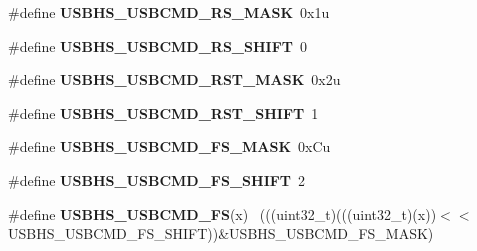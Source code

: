 \begin{DoxyCompactItemize}
\item 
\hypertarget{group___u_s_b_h_s___register___masks_ga3bc037751946a975ae821d1becf3fa7d}{}\#define {\bfseries U\+S\+B\+H\+S\+\_\+\+U\+S\+B\+C\+M\+D\+\_\+\+R\+S\+\_\+\+M\+A\+S\+K}~0x1u\label{group___u_s_b_h_s___register___masks_ga3bc037751946a975ae821d1becf3fa7d}

\item 
\hypertarget{group___u_s_b_h_s___register___masks_ga17639335fc7381daecab31030449b1d9}{}\#define {\bfseries U\+S\+B\+H\+S\+\_\+\+U\+S\+B\+C\+M\+D\+\_\+\+R\+S\+\_\+\+S\+H\+I\+F\+T}~0\label{group___u_s_b_h_s___register___masks_ga17639335fc7381daecab31030449b1d9}

\item 
\hypertarget{group___u_s_b_h_s___register___masks_ga2ef57ff061699c373517177ceea69f2e}{}\#define {\bfseries U\+S\+B\+H\+S\+\_\+\+U\+S\+B\+C\+M\+D\+\_\+\+R\+S\+T\+\_\+\+M\+A\+S\+K}~0x2u\label{group___u_s_b_h_s___register___masks_ga2ef57ff061699c373517177ceea69f2e}

\item 
\hypertarget{group___u_s_b_h_s___register___masks_ga0d23e3c90e946cc3d55acebb14dfba12}{}\#define {\bfseries U\+S\+B\+H\+S\+\_\+\+U\+S\+B\+C\+M\+D\+\_\+\+R\+S\+T\+\_\+\+S\+H\+I\+F\+T}~1\label{group___u_s_b_h_s___register___masks_ga0d23e3c90e946cc3d55acebb14dfba12}

\item 
\hypertarget{group___u_s_b_h_s___register___masks_gadad55c67e6d80289c0b218f3734f83b6}{}\#define {\bfseries U\+S\+B\+H\+S\+\_\+\+U\+S\+B\+C\+M\+D\+\_\+\+F\+S\+\_\+\+M\+A\+S\+K}~0x\+Cu\label{group___u_s_b_h_s___register___masks_gadad55c67e6d80289c0b218f3734f83b6}

\item 
\hypertarget{group___u_s_b_h_s___register___masks_ga19af14277fc3d0013427f16b853f142d}{}\#define {\bfseries U\+S\+B\+H\+S\+\_\+\+U\+S\+B\+C\+M\+D\+\_\+\+F\+S\+\_\+\+S\+H\+I\+F\+T}~2\label{group___u_s_b_h_s___register___masks_ga19af14277fc3d0013427f16b853f142d}

\item 
\hypertarget{group___u_s_b_h_s___register___masks_ga93b679eb31fc8e61227e574b679b8608}{}\#define {\bfseries U\+S\+B\+H\+S\+\_\+\+U\+S\+B\+C\+M\+D\+\_\+\+F\+S}(x)                                          ~(((uint32\+\_\+t)(((uint32\+\_\+t)(x))$<$$<$U\+S\+B\+H\+S\+\_\+\+U\+S\+B\+C\+M\+D\+\_\+\+F\+S\+\_\+\+S\+H\+I\+F\+T))\&U\+S\+B\+H\+S\+\_\+\+U\+S\+B\+C\+M\+D\+\_\+\+F\+S\+\_\+\+M\+A\+S\+K)\label{group___u_s_b_h_s___register___masks_ga93b679eb31fc8e61227e574b679b8608}


\end{DoxyCompactItemize}
